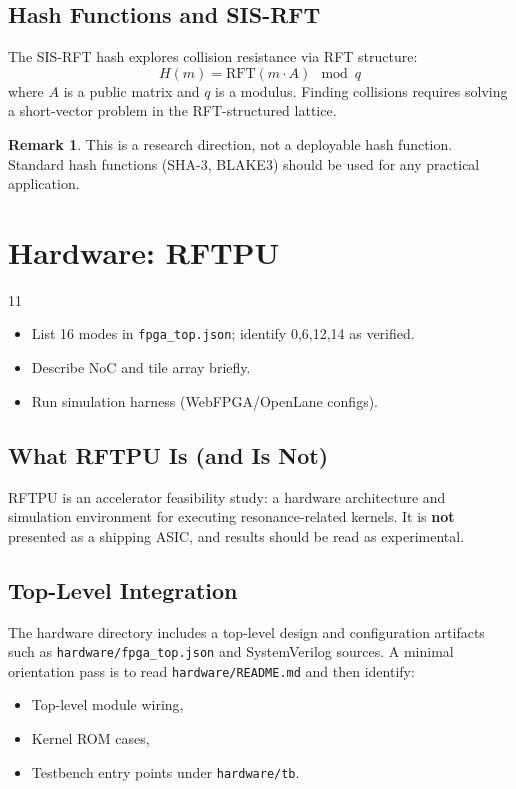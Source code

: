 \documentclass[11pt, a4paper, openany]{book}
\theoremstyle{definition}
\newtheorem{remark}{Remark}[chapter]
\begin{document}
\section{Hash Functions and SIS-RFT}
The SIS-RFT hash explores collision resistance via RFT structure:
\begin{equation}
H(m) = \text{RFT}(m \cdot A) \mod q
\end{equation}
where $A$ is a public matrix and $q$ is a modulus. Finding collisions requires solving a short-vector problem in the RFT-structured lattice.

\begin{remark}
This is a research direction, not a deployable hash function. Standard hash functions (SHA-3, BLAKE3) should be used for any practical application.
\end{remark}

\chapter{Hardware: RFTPU}

\begin{todobox}{11}
\begin{itemize}
    \item[$\square$] List 16 modes in \texttt{fpga\_top.json}; identify 0,6,12,14 as verified.
    \item[$\square$] Describe NoC and tile array briefly.
    \item[$\square$] Run simulation harness (WebFPGA/OpenLane configs).
\end{itemize}
\end{todobox}

\section{What RFTPU Is (and Is Not)}
RFTPU is an accelerator feasibility study: a hardware architecture and simulation environment for executing resonance-related kernels. It is \textbf{not} presented as a shipping ASIC, and results should be read as experimental.

\section{Top-Level Integration}
The hardware directory includes a top-level design and configuration artifacts such as \texttt{hardware/fpga\_top.json} and SystemVerilog sources. A minimal orientation pass is to read \texttt{hardware/README.md} and then identify:
\begin{itemize}
    \item Top-level module wiring,
    \item Kernel ROM cases,
    \item Testbench entry points under \texttt{hardware/tb}.
\end{itemize}
\end{document}
